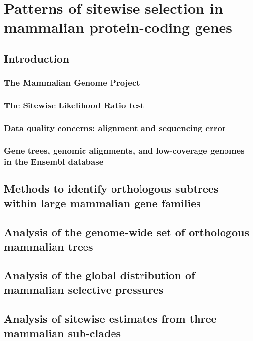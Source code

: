\chapter{Patterns of sitewise selection in mammalian protein-coding genes}\label{ch:mammals1}

\section{Introduction}

\subsection{The Mammalian Genome Project}

\subsection{The Sitewise Likelihood Ratio test}

\subsection{Data quality concerns: alignment and sequencing error}

\subsection{Gene trees, genomic alignments, and low-coverage genomes in the Ensembl database}

\section{Methods to identify orthologous subtrees within large mammalian gene families}

\section{Analysis of the genome-wide set of orthologous mammalian trees}

\section{Analysis of the global distribution of mammalian selective pressures}

\section{Analysis of sitewise estimates from three mammalian sub-clades}

